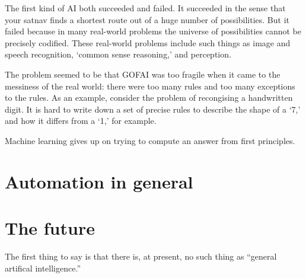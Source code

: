\documentclass[10pt, a4paper, twocolumn]{article}
\begin{document}
The first kind of AI both succeeded and failed. It succeeded in the sense that
your satnav finds a shortest route out of a huge number of possibilities. But it
failed because in many real-world problems the universe of possibilities cannot
be precisely codified. These real-world problems include such things as image
and speech recognition, `common sense reasoning,' and perception.

The problem seemed to be that GOFAI was too fragile when it came to the
messiness of the real world: there were too many rules and too many exceptions
to the rules. As an example, consider the problem of recongising a handwritten
digit. It is hard to write down a set of precise rules to describe the shape of
a `7,' and how it differs from a `1,' for example.

Machine learning gives up on trying to compute an answer from first principles. 










\section{Automation in general}

\section{The future}

The first thing to say is that there is, at present, no such thing as ``general
artifical intelligence.''
\end{document}
